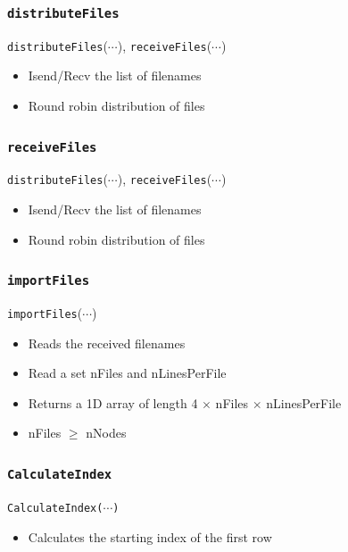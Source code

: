 \documentclass[usernames,dvipsnames]{beamer}
\begin{document}

\begin{frame}
	\frametitle{\texttt{distributeFiles}}
	
    		\texttt{distributeFiles}($\cdots$), \texttt{receiveFiles}($\cdots$)
    		\begin{itemize}
    			\item Isend/Recv the list of filenames
    			\item Round robin distribution of files
    		\end{itemize}
    		
\end{frame}



\begin{frame}
	\frametitle{\texttt{receiveFiles}}
	
    		\texttt{distributeFiles}($\cdots$), \texttt{receiveFiles}($\cdots$)
    		\begin{itemize}
    			\item Isend/Recv the list of filenames
    			\item Round robin distribution of files
    		\end{itemize}
    		
\end{frame}



\begin{frame}
	\frametitle{\texttt{importFiles}}
	
    		\texttt{importFiles}($\cdots$)
    		\begin{itemize}
    			\item Reads the received filenames
    			\item Read a set nFiles and nLinesPerFile
    			\item Returns a 1D array of length 4 $\times$ nFiles $\times$ nLinesPerFile
    			\item nFiles $\ge$ nNodes
    		\end{itemize}
    		
\end{frame}



\begin{frame}
	\frametitle{\texttt{CalculateIndex}}
	
    		\texttt{CalculateIndex($\cdots$)}
    		    \begin{itemize}
    		        \item Calculates the starting index of the first row
    		    \end{itemize}

\end{frame}
\end{document}
